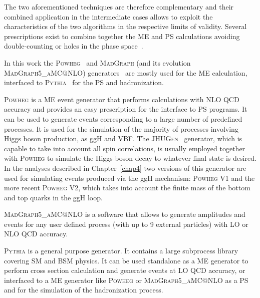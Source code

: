 The two aforementioned techniques are therefore complementary and their combined application in the intermediate cases allows to exploit the characteristics of the two algorithms in the respective limits of validity. Several prescriptions exist to combine together the ME and PS calculations avoiding double-counting or holes in the phase space~\cite{Hoche:2006ph}.

In this work the \textsc{Powheg}~\cite{Kramer:2005hw,Frixione:2007vw,Lavesson:2008ah,Alioli:2008tz, Nason:2009ai} and \textsc{MadGraph} (and its evolution \textsc{MadGraph5\_aMC@NLO}) generators~\cite{Alwall:2014hca} are mostly used for the ME calculation, interfaced to \textsc{Pythia}~\cite{Sjostrand:2006za,Sjostrand:2007gs} for the PS and hadronization. 

\textsc{Powheg} is a ME event generator that performs calculations with NLO QCD accuracy and provides an easy prescription for the interface to PS programs. It can be used to generate events corresponding to a large number of predefined processes. It is used for the simulation of the majority of processes involving Higgs boson production, as ggH and VBF. The \textsc{JHUGen}~\cite{JHUGen} generator, which is capable to take into account all spin correlations, is usually employed together with \textsc{Powheg} to simulate the Higgs boson decay to whatever final state is desired. In the analyses described in Chapter~\ref{chap4} two versions of this generator are used for simulating events produced via the ggH mechanism: \textsc{Powheg V1} and the more recent \textsc{Powheg V2}, which takes into account the finite mass of the bottom and top quarks in the ggH loop.

\textsc{MadGraph5\_aMC@NLO} is a software that allows to generate amplitudes and events for any user defined process (with up to 9 external particles) with LO or NLO QCD accuracy.

\textsc{Pythia} is a general purpose generator. It contains a large subprocess library covering SM and BSM physics. It can be used standalone as a ME generator to perform cross section calculation and generate events at LO QCD accuracy, or interfaced to a ME generator like \textsc{Powheg} or \textsc{MadGraph5\_aMC@NLO} as a PS and for the simulation of the hadronization process.

